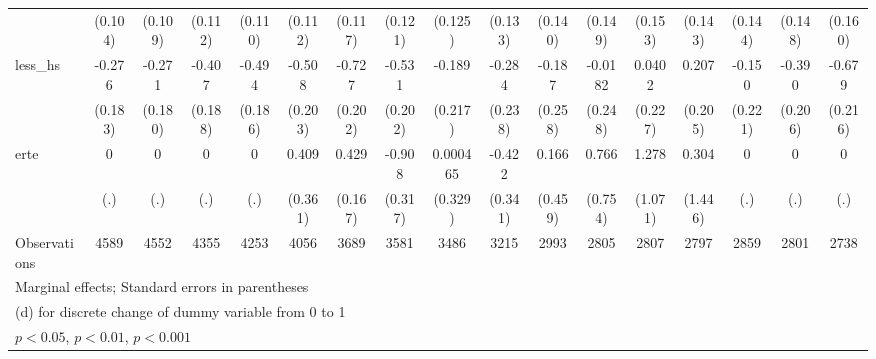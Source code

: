 {\begin{tabular}{l*{16}{c}}
                    &     (0.104)         &     (0.109)         &     (0.112)         &     (0.110)         &     (0.112)         &     (0.117)         &     (0.121)         &     (0.125)         &     (0.133)         &     (0.140)         &     (0.149)         &     (0.153)         &     (0.143)         &     (0.144)         &     (0.148)         &     (0.160)         \\
[1em]
less\_hs             &      -0.276         &      -0.271         &      -0.407\sym{*}  &      -0.494\sym{**} &      -0.508\sym{*}  &      -0.727\sym{***}&      -0.531\sym{**} &      -0.189         &      -0.284         &      -0.187         &     -0.0182         &      0.0402         &       0.207         &      -0.150         &      -0.390         &      -0.679\sym{**} \\
                    &     (0.183)         &     (0.180)         &     (0.188)         &     (0.186)         &     (0.203)         &     (0.202)         &     (0.202)         &     (0.217)         &     (0.238)         &     (0.258)         &     (0.248)         &     (0.227)         &     (0.205)         &     (0.221)         &     (0.206)         &     (0.216)         \\
[1em]
erte                &           0         &           0         &           0         &           0         &       0.409         &       0.429\sym{*}  &      -0.908\sym{**} &    0.000465         &      -0.422         &       0.166         &       0.766         &       1.278         &       0.304         &           0         &           0         &           0         \\
                    &         (.)         &         (.)         &         (.)         &         (.)         &     (0.361)         &     (0.167)         &     (0.317)         &     (0.329)         &     (0.341)         &     (0.459)         &     (0.754)         &     (1.071)         &     (1.446)         &         (.)         &         (.)         &         (.)         \\
\hline
Observations        &        4589         &        4552         &        4355         &        4253         &        4056         &        3689         &        3581         &        3486         &        3215         &        2993         &        2805         &        2807         &        2797         &        2859         &        2801         &        2738         \\
\hline\hline
\multicolumn{17}{l}{\footnotesize Marginal effects; Standard errors in parentheses}\\
\multicolumn{17}{l}{\footnotesize  (d) for discrete change of dummy variable from 0 to 1}\\
\multicolumn{17}{l}{\footnotesize \sym{*} \(p<0.05\), \sym{**} \(p<0.01\), \sym{***} \(p<0.001\)}\\
\end{tabular}
}
